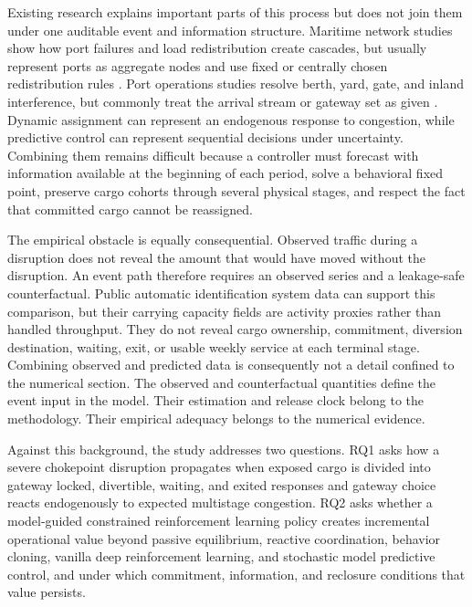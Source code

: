 \documentclass[a4paper,fleqn]{cas-sc}
\begin{document}
Existing research explains important parts of this process but does not join
them under one auditable event and information structure. Maritime network
studies show how port failures and load redistribution create cascades, but
usually represent ports as aggregate nodes and use fixed or centrally chosen
redistribution rules \citep{XuEtAl2022,XuEtAl2025,LuEtAl2024,CaoEtAl2025}.
Port operations studies resolve berth, yard, gate, and inland interference, but
commonly treat the arrival stream or gateway set as given
\citep{TalleyNg2016,Zhen2016,ZhangEtAl2025,LeiJia2026}. Dynamic assignment can
represent an endogenous response to congestion, while predictive control can
represent sequential decisions under uncertainty. Combining them remains
difficult because a controller must forecast with information available at the
beginning of each period, solve a behavioral fixed point, preserve cargo cohorts
through several physical stages, and respect the fact that committed cargo
cannot be reassigned.

The empirical obstacle is equally consequential. Observed traffic during a
disruption does not reveal the amount that would have moved without the
disruption. An event path therefore requires an observed series and a
leakage-safe counterfactual. Public automatic identification system data can
support this comparison, but their carrying capacity fields are activity
proxies rather than handled throughput. They do not reveal cargo ownership,
commitment, diversion destination, waiting, exit, or usable weekly service at
each terminal stage. Combining observed and predicted data is consequently not
a detail confined to the numerical section. The observed and counterfactual
quantities define the event input in the model. Their estimation and release
clock belong to the methodology. Their empirical adequacy belongs to the
numerical evidence.

Against this background, the study addresses two questions. RQ1 asks how a
severe chokepoint disruption propagates when exposed cargo is divided into
gateway locked, divertible, waiting, and exited responses and gateway choice
reacts endogenously to expected multistage congestion. RQ2 asks whether a
model-guided constrained reinforcement learning policy creates incremental
operational value beyond passive equilibrium, reactive coordination,
behavior cloning, vanilla deep reinforcement learning, and stochastic model
predictive control, and under which commitment, information, and reclosure
conditions that value persists.
\end{document}
